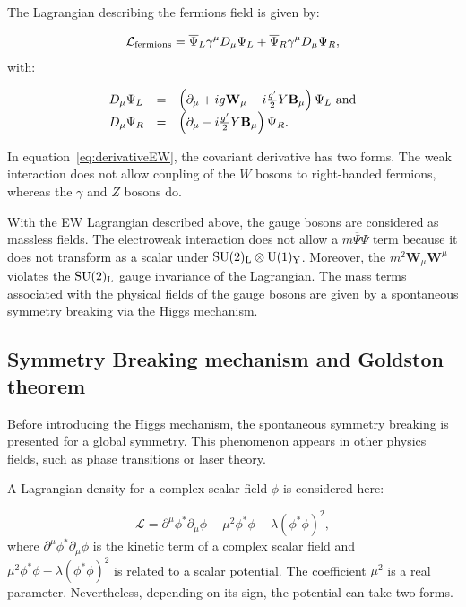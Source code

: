     The Lagrangian describing the fermions field is given by:

    \begin{equation}
      \mathcal{L}_{\rm{fermions}} = \overline{\Psi}_L\gamma^{\mu}D_{\mu}\Psi_L + \overline{\Psi}_R\gamma^{\mu}D_{\mu}\Psi_R,
    \end{equation}
    with:
      
    \begin{equation}
      \begin{array}{lcl}
      D_{\mu}\Psi_L & = & \left( \partial_{\mu} + ig \textbf{W}_{\mu} - i \frac{g'}{2} Y \textbf{B}_{\mu}\right)\Psi_L~\rm{and} \\
      D_{\mu}\Psi_R & = & \left(\partial_{\mu} - i\frac{g'}{2} Y \textbf{B}_{\mu}\right)\Psi_R.
      \end{array}
      \label{eq:derivativeEW}
    \end{equation}
    
    In equation~\ref{eq:derivativeEW}, the covariant derivative has two forms. 
    The weak interaction does not allow coupling of the $W$ bosons to right-handed fermions, whereas the $\gamma$ and $Z$ bosons do.

    With the \gls{EW} Lagrangian described above, the gauge bosons are considered as massless fields.
    The electroweak interaction does not allow a $m\overline{\Psi}\Psi$ term because it does not transform as a scalar under $\rm{SU}(2)_{\rm{L}} \otimes \rm{U}(1)_{\rm{Y}}$.
    Moreover, the $m^2 \textbf{W}_{\mu} \textbf{W}^{\mu}$ violates the $\rm{SU}(2)_{\rm{L}}$ gauge invariance of the Lagrangian.
    The mass terms associated with the physical fields of the gauge bosons are given by a spontaneous symmetry breaking via the Higgs mechanism.

      \subsection{Symmetry Breaking mechanism and Goldston theorem}
    
      Before introducing the Higgs mechanism, the spontaneous symmetry breaking is presented for a global symmetry.
      This phenomenon appears in other physics fields, such as phase transitions or laser theory.

      A Lagrangian density for a complex scalar field $\phi$ is considered here:

      \begin{equation}
        \mathcal{L} = \partial^{\mu}\phi^{*} \partial_{\mu}\phi - \mu^2\phi^{*}\phi - \lambda (\phi^{*}\phi)^2,
        \label{eq:ssbLagrangian}
      \end{equation}
      where $\partial^{\mu}\phi^{*} \partial_{\mu}\phi$ is the kinetic term of a complex scalar field and $\mu^2\phi^{*}\phi - \lambda (\phi^{*}\phi)^2$ is related to a scalar potential.
      The coefficient $\mu^2$ is a real parameter. 
      Nevertheless, depending on its sign, the potential can take two forms.

